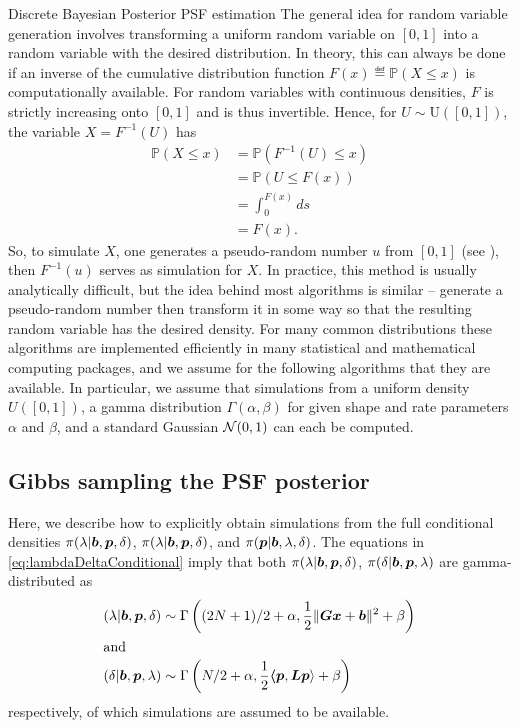 \begin{chapter}{Discrete Bayesian Posterior PSF estimation}
The general idea for random variable generation involves transforming a uniform random variable on $[0,1]$ into a random variable with the desired distribution.
In theory, this can always be done if an inverse of the cumulative distribution function $F(x) \eqdef \mathbb P(X \le x)$ is computationally available.
For random variables with continuous densities, $F$ is strictly increasing onto $[0,1]$ and is thus invertible.  
Hence, for $U\sim \mathrm{U([0,1])}$, the variable $X = F^{-1}(U)$ has 
\begin{align}
  \mathbb P( X \le x) 
  &= \mathbb P( F^{-1}(U)\le  x ) \nonumber \\
  &= \mathbb P( U \le F(x) )\nonumber\\
  &= \int_0^{F(x)}ds\nonumber\\
  &= F(x).
\end{align}
So, to simulate $X$, one generates a pseudo-random number $u$ from $[0,1]$ (see \citep{knuthart1981}), then $F^{-1}(u)$ serves as simulation for $X$.
In practice, this method is usually analytically difficult, but the idea behind most algorithms is similar -- generate a pseudo-random number then transform it in some way so that the resulting random variable has the desired density.
For many common distributions these algorithms are implemented efficiently in many statistical and mathematical computing packages, and we assume for the following algorithms that they are available.
In particular, we assume that simulations from a uniform density $U([0,1])$, a gamma distribution $\Gamma(\alpha,\beta)$ for given shape and rate parameters $\alpha$ and $\beta$, and a standard Gaussian $\mathcal{N}(0,1)$ can each be computed.

\subsection{Gibbs sampling the PSF posterior} \label{subsec:gibs}

Here, we describe how to explicitly obtain simulations from the full conditional densities $\pi(\lambda|\mbox{\boldmath$b$},\mbox{\boldmath$p$},\delta)$, $\pi(\lambda|\mbox{\boldmath$b$},\mbox{\boldmath$p$},\delta)$, and $\pi(\mbox{\boldmath$p$}|\mbox{\boldmath$b$},\lambda,\delta)$.
The equations in \eqref{eq:lambdaDeltaConditional} imply that both $\pi(\lambda|\mbox{\boldmath$b$},\mbox{\boldmath$p$},\delta)$, $\pi(\delta|\mbox{\boldmath$b$},\mbox{\boldmath$p$},\lambda)$ are gamma-distributed as
\begin{align}
  (\lambda|\mbox{\boldmath$b$},\mbox{\boldmath$p$},\delta) &\sim \Gamma\left((2N+1)/2+\alpha,\frac{1}{2}\|\mbox{\boldmath$Gx$} + \mbox{\boldmath$b$}\|^2 + \beta\right)\\
  \intertext{and}
  (\delta|\mbox{\boldmath$b$},\mbox{\boldmath$p$},\lambda) &\sim \Gamma\left(N/2+\alpha,\frac{1}{2}\mbox{\boldmath$\langle$} \mbox{\boldmath$p$},\mbox{\boldmath$L$}\mbox{\boldmath$p$} \rangle+ \beta\right)
\end{align}
respectively, of which simulations are assumed to be available.


\end{chapter}

